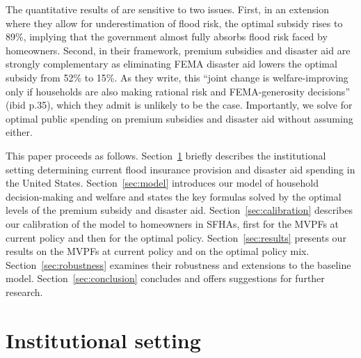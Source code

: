 \documentclass[12pt]{article}
\begin{document}
The quantitative results of \cite{gruber2026optimal} are sensitive to two issues. First, in an extension where they allow for underestimation of flood risk, the optimal subsidy rises to 89\%, implying that the government almost fully absorbs flood risk faced by homeowners. Second, in their framework, premium subsidies and disaster aid are strongly complementary as eliminating FEMA disaster aid lowers the optimal subsidy from 52\% to 15\%. As they write, this ``joint change is welfare-improving only if households are also making rational risk and FEMA-generosity decisions'' (ibid p.35), which they admit is unlikely to be the case. Importantly, we solve for  optimal public spending on premium subsidies and disaster aid without assuming either.

This paper proceeds as follows. Section~\ref{sec:institutional} briefly describes the institutional setting determining current flood insurance provision and disaster aid spending in the United States. Section~\ref{sec:model} introduces our model of household decision-making and welfare and states the key formulas solved by the optimal levels of the premium subsidy and disaster aid. Section~\ref{sec:calibration} describes our calibration of the model to homeowners in SFHAs, first for the MVPFs at current policy and then for the optimal policy. Section~\ref{sec:results} presents our results on the MVPFs at current policy and on the optimal policy mix. Section~\ref{sec:robustness} examines their robustness and extensions to the baseline model. Section~\ref{sec:conclusion} concludes and offers suggestions for further research.

\section{Institutional setting}
\label{sec:institutional}
\end{document}
